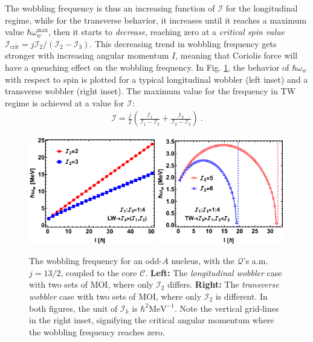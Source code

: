 The wobbling frequency is thus an increasing function of $\mathscr{I}$ for the longitudinal regime, while for the transverse behavior, it increases until it reaches a maximum value $\hbar\omega_w^\text{max}$, then it starts to \emph{decrease}, reaching zero at a \emph{critical spin value} $\mathscr{I}_\text{crit}=j\mathcal{I}_2/(\mathcal{I}_2-\mathcal{I}_3)$. This decreasing trend in wobbling frequency gets stronger with increasing angular momentum $I$, meaning that Coriolis force will have a quenching effect on the wobbling frequency. In Fig. \ref{wobbling-freq-oddA}, the behavior of $\hbar\omega_w$ with respect to spin is plotted for a typical longitudinal wobbler (left inset) and a transverse wobbler (right inset). The maximum value for the frequency in TW regime is achieved at a value for $\mathscr{I}$:
\begin{align}
    \mathscr{I}=\frac{j}{2}\left(\frac{\mathcal{I}_1}{\mathcal{I}_1-\mathcal{I}_3}+\frac{\mathcal{I}_2}{\mathcal{I}_2-\mathcal{I}_3}\right)\ .
\end{align}
\begin{figure}
    \centering
    \includegraphics[width=0.49\textwidth]{Chapters/Figures/wobb_freq_oddA-LW.pdf}
    \includegraphics[width=0.49\textwidth]{Chapters/Figures/wobb_freq_oddA-TW.pdf}
    \caption{The wobbling frequency for an odd-$A$ nucleus, with the $\mathcal{Q}$'s a.m. $j=13/2$, coupled to the core $\mathscr{C}$. \textbf{Left:} The \emph{longitudinal wobbler} case with two sets of MOI, where only $\mathcal{I}_2$ differs. \textbf{Right:} The \emph{transverse wobbler} case with two sets of MOI, where only $\mathcal{I}_2$ is different. In both figures, the unit of $\mathcal{I}_k$ is $\hbar^2\text{MeV}^{-1}$. Note the vertical grid-lines in the right inset, signifying the critical angular momentum where the wobbling frequency reaches zero.}
    \label{wobbling-freq-oddA}
\end{figure}

